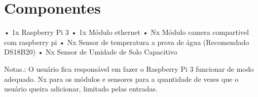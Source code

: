 \documentclass[main.tex]{subfiles}
\begin{document}
\section{Componentes}
• 1x Raspberry Pi 3 \newline
• 1x Módulo ethernet \newline
• Nx Módulo camera compartivel com raspberry pi \newline
• Nx Sensor de temperatura a prova de água (Recomendado DS18B20) \newline
• Nx Sensor de Umidade de Solo Capacitivo \newline

Notas.: \newline
O usuário fica responsável em fazer o Raspberry Pi 3 funcionar de modo adequado. \newline
Nx para os módulos e sensores para a quantidade de vezes que o usuário queira adicionar, limitado pelas entradas. \newline
\end{document}
